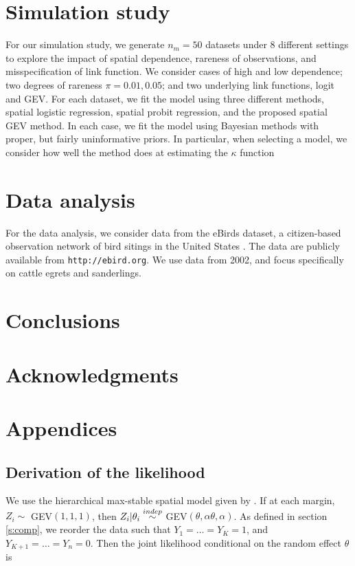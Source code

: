\documentclass[11pt]{article}
\begin{document}
\section{Simulation study}\label{s:sim}
For our simulation study, we generate $n_m = 50$ datasets under 8 different settings to explore the impact of spatial dependence, rareness of observations, and misspecification of link function.
We consider cases of high and low dependence; two degrees of rareness $\pi = 0.01, 0.05$; and two underlying link functions, logit and GEV.
For each dataset, we fit the model using three different methods, spatial logistic regression, spatial probit regression, and the proposed spatial GEV method.
In each case, we fit the model using Bayesian methods with proper, but fairly uninformative priors.
In particular, when selecting a model, we consider how well the method does at estimating the  $\kappa$ function

\section{Data analysis}\label{s:analysis}
For the data analysis, we consider data from the eBirds dataset, a citizen-based observation network of bird sitings in the United States \citep{Sullivan2009}.
The data are publicly available from {\tt http://ebird.org}.
We use data from 2002, and focus specifically on cattle egrets and sanderlings.

\section{Conclusions}\label{s:con}

\section*{Acknowledgments}

\appendix
\section{Appendices}

\subsection{Derivation of the likelihood} \label{a:likelihoodderivation}
We use the hierarchical max-stable spatial model given by \citet{Reich2012}. If at each margin, $Z_i \sim $ GEV$(1,1,1)$, then $Z_i | \theta_i \stackrel{indep}{\sim} $ GEV$(\theta, \alpha \theta, \alpha)$. As defined in section \ref{s:comp}, we reorder the data such that $Y_1=\ldots=Y_K=1$, and $Y_{K+1} = \ldots = Y_n = 0$. Then the joint likelihood conditional on the random effect $\theta$ is
\end{document}
